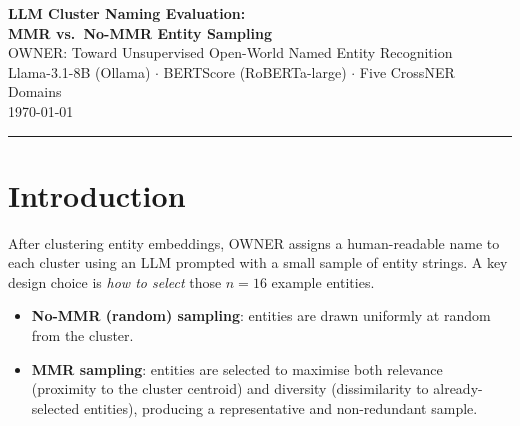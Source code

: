 \documentclass[11pt,a4paper]{article}
\begin{document}
\begin{center}
  {\LARGE\bfseries\color{ownerblue}
    LLM Cluster Naming Evaluation:\\[0.3em]
    MMR vs.\ No-MMR Entity Sampling}\\[0.6em]
  {\large OWNER: Toward Unsupervised Open-World Named Entity Recognition\\
  Llama-3.1-8B (Ollama) $\cdot$ BERTScore (RoBERTa-large) $\cdot$ Five CrossNER Domains}\\[0.5em]
  {\small \today}
\end{center}
\vspace{0.4em}\hrule\vspace{1.2em}

\begin{abstract}
This report evaluates the effect of \textbf{Maximal Marginal Relevance (MMR)} entity sampling on LLM-based cluster naming in the OWNER system.
Cluster names generated by Llama-3.1-8B-Instruct (via Ollama, $n{=}16$ entities) are scored with BERTScore (RoBERTa-large) against ground-truth CrossNER labels across five domains: AI, Literature, Music, Politics, and Science.
Results are compared against the OWNER baseline~\cite{cluster_naming_baseline}.

\smallskip\noindent\textbf{Main finding:} MMR and No-MMR produce nearly identical results for most domains (avg $F_1$: MMR~$= 0.923$, No-MMR~$= 0.926$, $\Delta = -0.002$).
No-MMR edges ahead in Music ($+0.011$) due to better entity-set coherence, while MMR performs slightly better in Literature ($+0.007$).
Both conditions underperform the baseline ($F_1 = 0.944$), primarily in domains where the clustering pipeline produces less cohesive clusters in these runs.
\end{abstract}

\section{Introduction}

After clustering entity embeddings, OWNER assigns a human-readable name to each cluster using an LLM prompted with a small sample of entity strings.
A key design choice is \emph{how to select} those $n=16$ example entities.

\begin{itemize}[leftmargin=1.5em]
  \item \textbf{No-MMR (random) sampling}: entities are drawn uniformly at random from the cluster.
  \item \textbf{MMR sampling}: entities are selected to maximise both relevance (proximity to the cluster centroid) and diversity (dissimilarity to already-selected entities), producing a representative and non-redundant sample.
\end{itemize}
\end{document}
